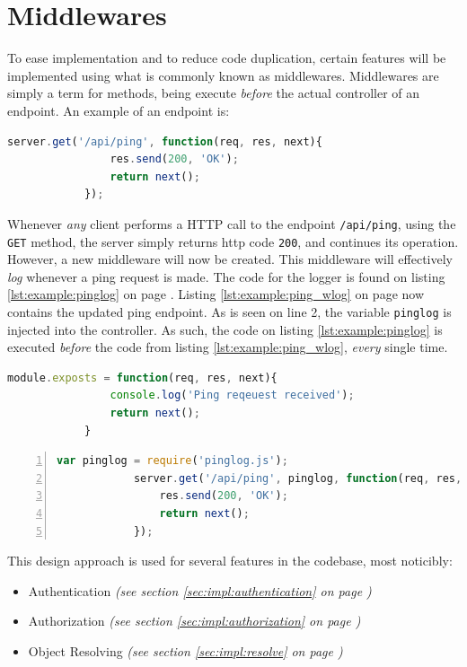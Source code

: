 	\section{Middlewares}
		To ease implementation and to reduce code duplication, certain features will be implemented using what is commonly known as middlewares. Middlewares are simply a term for methods, being execute \emph{before} the actual controller of an endpoint. An example of an endpoint is:
		\begin{lstlisting}[gobble=12,language=JavaScript]
            server.get('/api/ping', function(req, res, next){
                res.send(200, 'OK');
                return next();
            });		
		\end{lstlisting}

		Whenever \emph{any} client performs a HTTP call to the endpoint \verb=/api/ping=, using the \verb=GET= method, the server simply returns http code \verb=200=, and continues its operation. However, a new middleware will now be created. This middleware will effectively \emph{log} whenever a ping request is made. The code for the logger is found on listing \ref{lst:example:pinglog} on page \pageref{lst:example:pinglog}. Listing \ref{lst:example:ping_wlog} on page \pageref{lst:example:ping_wlog} now contains the updated ping endpoint. As is seen on line 2, the variable \verb=pinglog= is injected into the controller. As such, the code on listing \ref{lst:example:pinglog} is executed \emph{before} the code from listing \ref{lst:example:ping_wlog}, \emph{every} single time.

		\begin{lstlisting}[gobble=12,language=JavaScript,caption={PingLog Middleware},label={lst:example:pinglog}]
            module.exposts = function(req, res, next){
                console.log('Ping reqeuest received');
                return next();
            }
		\end{lstlisting}

		\begin{lstlisting}[gobble=12,language=JavaScript,caption={Ping endpoint with the pinglog middleware},numbers=left,label={lst:example:ping_wlog}]
            var pinglog = require('pinglog.js');
            server.get('/api/ping', pinglog, function(req, res, next){
                res.send(200, 'OK');
                return next();
            });		
		\end{lstlisting}

		This design approach is used for several features in the codebase, most noticibly:
		\begin{itemize}
			\item Authentication \emph{(see section \ref{sec:impl:authentication} on page \pageref{sec:impl:authentication})}
			\item Authorization \emph{(see section \ref{sec:impl:authorization} on page \pageref{sec:impl:authorization})}
			\item Object Resolving \emph{(see section \ref{sec:impl:resolve} on page \pageref{sec:impl:resolve})}
		\end{itemize}

